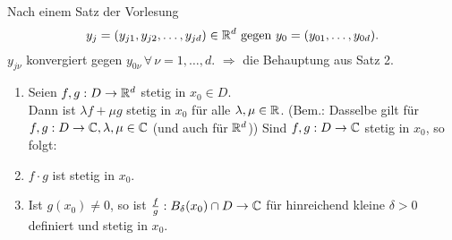 \documentclass[../ana1.tex]{subfiles}
\begin{document}
\begin{bew}
    Nach einem Satz der Vorlesung
    \[ y_j = (y_{j1}, y_{j2}, \dots, y_{jd}) \in \mathbb{R}^d \text{ gegen } y_0  = (y_{01}, \dots,y_{0d}). \]
    \( y_{j\nu} \) konvergiert gegen \( y_{0\nu} \,\forall \, \nu = 1,\dots,d \).
    \( \Rightarrow \) die Behauptung aus Satz 2.
\end{bew}
\begin{satz}[Stetigkeitsregeln]\leavevmode
    \begin{enumerate}
        \item Seien \( f,g : D \rightarrow \mathbb{R}^d \) stetig in \( x_0 \in D \).\\
        Dann ist \( \lambda f + \mu g \) stetig in \( x_0 \) für alle 
        \( \lambda, \mu \in \mathbb{R} \).
        (Bem.: Dasselbe gilt für \( f,g:D\rightarrow \mathbb{C}, 
        \lambda, \mu \in \mathbb{C} \) (und auch für \( \mathbb{R}^d \)))
        Sind \( f,g: D\rightarrow \mathbb{C} \) stetig in \( x_0 \), so folgt:
        \item \( f \cdot g \) ist stetig in \( x_0 \).
        \item Ist \( g(x_0) \neq 0 \), so ist \( \frac{f}{g} : 
        B_\delta(x_0) \cap D \rightarrow \mathbb{C} \) für hinreichend kleine 
        \( \delta > 0 \) definiert und stetig in \( x_0 \).
    \end{enumerate}
\end{satz}
\end{document}
